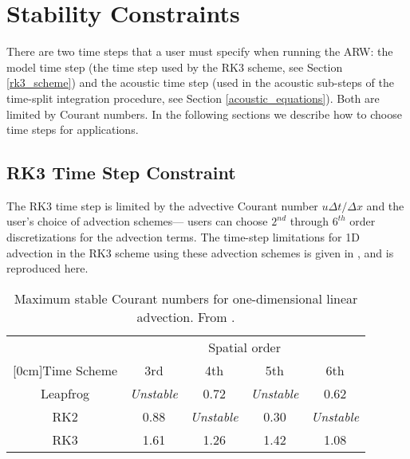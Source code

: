 \section{Stability Constraints}

There are two time steps that a user must specify when running the ARW:
the model time step (the time step used by the RK3 scheme, see 
Section \ref{rk3_scheme}) and the acoustic time step (used in the 
acoustic sub-steps of the time-split integration procedure,
see Section \ref{acoustic_equations}).  Both are limited by Courant
numbers. 
In the following sections we describe how to choose time steps
for applications.

\subsection{RK3 Time Step Constraint}
\label{rk3_timestep_constraint}

The RK3 time step is limited by the advective Courant number $u \Delta
t/\Delta x$ and the user's choice of advection schemes--- users can
choose $2^{nd}$ through $6^{th}$ order discretizations for the advection
terms.  The time-step limitations for 1D advection in the RK3 scheme 
using these advection schemes is given in \citet{wicker02}, 
and is reproduced here.

\begin{table}[h]
\begin{center}
\begin{tabular}{|c|c|c|c|c|} \hline
& \multicolumn{4}{c|}{Spatial order} \\\cline{2-5}
\raisebox{1.5ex}[0cm]{Time Scheme}
& 3rd & 4th & 5th & 6th \\\hline
Leapfrog & {\em Unstable} & 0.72 & {\em Unstable} & 0.62 \\\hline
RK2 & 0.88 & {\em Unstable} & 0.30 & {\em Unstable} \\\hline
RK3 & 1.61 & 1.26 & 1.42 & 1.08 \\\hline
\end{tabular}
\end{center}
\caption{Maximum stable Courant numbers for one-dimensional linear
advection.  From \citet{wicker02}.}
\label{courant_table}
\end{table}

